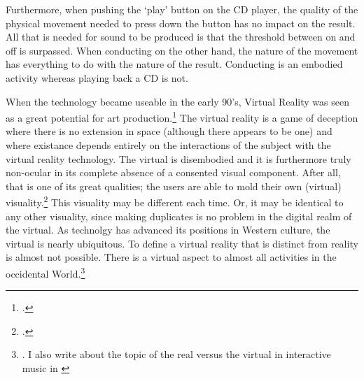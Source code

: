 Furthermore, when pushing the `play' button on the CD player, the quality of the physical movement needed to press down the button has no impact on the result. All that is needed for sound to be produced is that the threshold between on and off is surpassed. When conducting on the other hand, the nature of the movement has everything to do with the nature of the result. Conducting is an embodied activity whereas playing back a CD is not.

When the technology became useable in the early 90's, Virtual Reality was seen as a great potential for art production.\footcite[See for example]{moser96,wood98,dixon07} The virtual reality is a game of deception where there is no extension in space (although there appears to be one) and where existance depends entirely on the interactions of the subject with the virtual reality technology. The virtual is disembodied and it is furthermore truly non-ocular in its complete absence of a consented visual component. After all, that is one of its great qualities; the users are able to mold their own (virtual) visuality.\footcite[Compare to William Gibson's definition of Cyberspace as a ``consensual hallucination''][51]{gibson84} This visuality may be different each time. Or, it may be identical to any other visuality, since making duplicates is no problem in the digital realm of the virtual. As technolgy has advanced its positions in Western culture, the virtual is nearly ubiquitous. To define a virtual reality that is distinct from reality is almost not possible. There is a virtual aspect to almost all activities in the occidental World.\footnote{\cite[See][]{baudrillard02:screened}. I also write about the topic of the real versus the virtual in interactive music in \cite[ch. 4]{frisk08}}

